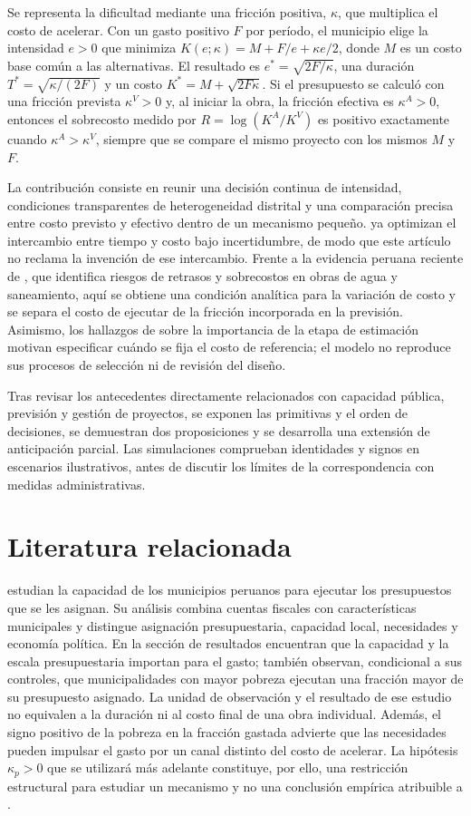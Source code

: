 \documentclass[11pt]{article}
\newcommand{\KA}{K^{A}}
\newcommand{\KV}{K^{V}}
\newcommand{\kA}{\kappa^{A}}
\newcommand{\kV}{\kappa^{V}}
\begin{document}
Se representa la dificultad mediante una fricción positiva, $\kappa$, que multiplica el costo de acelerar. Con un gasto positivo $F$ por período, el municipio elige la intensidad $e>0$ que minimiza $K(e;\kappa)=M+F/e+\kappa e/2$, donde $M$ es un costo base común a las alternativas. El resultado es $e^*=\sqrt{2F/\kappa}$, una duración $T^*=\sqrt{\kappa/(2F)}$ y un costo $K^*=M+\sqrt{2F\kappa}$. Si el presupuesto se calculó con una fricción prevista $\kV>0$ y, al iniciar la obra, la fricción efectiva es $\kA>0$, entonces el sobrecosto medido por $R=\log(\KA/\KV)$ es positivo exactamente cuando $\kA>\kV$, siempre que se compare el mismo proyecto con los mismos $M$ y $F$.

La contribución consiste en reunir una decisión continua de intensidad, condiciones transparentes de heterogeneidad distrital y una comparación precisa entre costo previsto y efectivo dentro de un mecanismo pequeño. \citet{mohammadi2022} ya optimizan el intercambio entre tiempo y costo bajo incertidumbre, de modo que este artículo no reclama la invención de ese intercambio. Frente a la evidencia peruana reciente de \citet{julca2025}, que identifica riesgos de retrasos y sobrecostos en obras de agua y saneamiento, aquí se obtiene una condición analítica para la variación de costo y se separa el costo de ejecutar de la fricción incorporada en la previsión. Asimismo, los hallazgos de \citet{eliasson2025} sobre la importancia de la etapa de estimación motivan especificar cuándo se fija el costo de referencia; el modelo no reproduce sus procesos de selección ni de revisión del diseño.

Tras revisar los antecedentes directamente relacionados con capacidad pública, previsión y gestión de proyectos, se exponen las primitivas y el orden de decisiones, se demuestran dos proposiciones y se desarrolla una extensión de anticipación parcial. Las simulaciones comprueban identidades y signos en escenarios ilustrativos, antes de discutir los límites de la correspondencia con medidas administrativas.

\section{Literatura relacionada}\label{sec:literatura}
\citet{loayza2014} estudian la capacidad de los municipios peruanos para ejecutar los presupuestos que se les asignan. Su análisis combina cuentas fiscales con características municipales y distingue asignación presupuestaria, capacidad local, necesidades y economía política. En la sección de resultados encuentran que la capacidad y la escala presupuestaria importan para el gasto; también observan, condicional a sus controles, que municipalidades con mayor pobreza ejecutan una fracción mayor de su presupuesto asignado. La unidad de observación y el resultado de ese estudio no equivalen a la duración ni al costo final de una obra individual. Además, el signo positivo de la pobreza en la fracción gastada advierte que las necesidades pueden impulsar el gasto por un canal distinto del costo de acelerar. La hipótesis $\kappa_p>0$ que se utilizará más adelante constituye, por ello, una restricción estructural para estudiar un mecanismo y no una conclusión empírica atribuible a \citet{loayza2014}.
\end{document}
